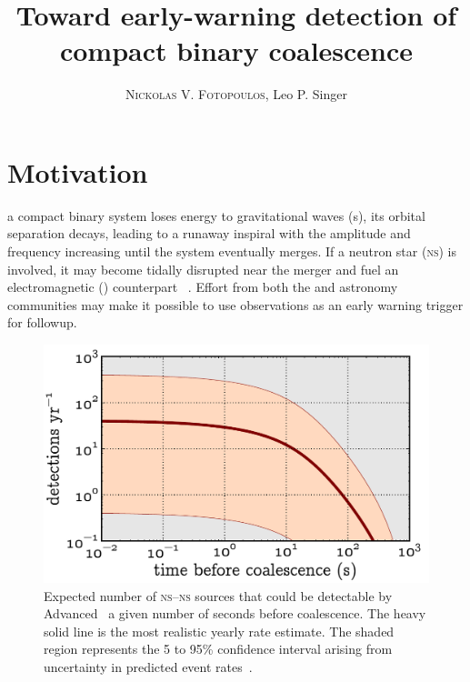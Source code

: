 \documentclass[portrait,plainboxedsections]{sciposter}
\title{Toward early-warning detection of compact binary coalescence}
\author{\textsc{Nickolas V. Fotopoulos}, Leo P. Singer}
\institute{\LIGO{} Laboratory, California Institute of Technology}
\begin{document}

\maketitle

\begin{minipage}[t]{0.25\textwidth}

\section*{Motivation}

 a compact binary system loses energy to gravitational waves (\GW{}s), its
orbital separation decays, leading to a runaway inspiral with the \GW{}
amplitude and frequency increasing until the system eventually merges.  If a
neutron star (\textsc{ns}) is involved, it may become tidally disrupted near
the merger and fuel an electromagnetic (\EM{}) counterpart~%
\cite{shibata:2007}.  Effort from both the \GW{} and astronomy communities may make it
possible to use \GW{} observations as an early warning trigger for \EM{}
followup.
%
\begin{figure}[h]
\includegraphics[width=\textwidth]{figures/snr_in_time}
\caption{\label{fig:earlywarning}Expected number of \textsc{ns}--\textsc{ns}
sources that could be detectable by Advanced \LIGO\ a given number of seconds
before coalescence.  The heavy solid line is the most realistic yearly rate
estimate.  The shaded region represents the 5 to 95\% confidence interval
arising from uncertainty in predicted event rates~\cite{Abadie:2010p10836}.}
\end{figure}

\end{minipage}
\end{document}
